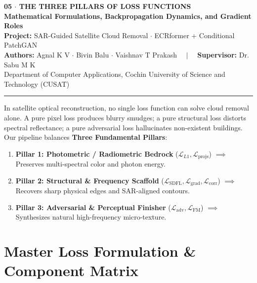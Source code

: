 \documentclass[11pt,a4paper]{article}
\begin{document}
\begin{center}
    {\LARGE \textbf{\textcolor{primary}{05 $\cdot$ THE THREE PILLARS OF LOSS FUNCTIONS}}}\\[0.4em]
    {\large \textbf{Mathematical Formulations, Backpropagation Dynamics, and Gradient Roles}}\\[0.6em]
    {\small \textbf{Project:} SAR-Guided Satellite Cloud Removal $\cdot$ ECRformer + Conditional PatchGAN}\\
    {\small \textbf{Authors:} Agnal K V $\cdot$ Bivin Balu $\cdot$ Vaishnav T Prakash $\quad|\quad$ \textbf{Supervisor:} Dr. Sabu M K}\\
    {\small Department of Computer Applications, Cochin University of Science and Technology (CUSAT)}
\end{center}
\vspace{-0.5em}
\noindent\rule{\linewidth}{1.2pt}

\vspace{0.8em}
\begin{tcolorbox}[colback=primary!5!white,colframe=primary,title=\textbf{Document Purpose \& The Tripartite Loss Architecture},fonttitle=\bfseries]
In satellite optical reconstruction, no single loss function can solve cloud removal alone. A pure pixel loss produces blurry smudges; a pure structural loss distorts spectral reflectance; a pure adversarial loss hallucinates non-existent buildings. Our pipeline balances \textbf{Three Fundamental Pillars}:
\begin{enumerate}[leftmargin=1.5em, itemsep=0.2em]
    \item \textbf{Pillar 1: Photometric / Radiometric Bedrock} ($\mathcal{L}_{L1}, \mathcal{L}_{\text{projs}}$) $\implies$ Preserves multi-spectral color and photon energy.
    \item \textbf{Pillar 2: Structural \& Frequency Scaffold} ($\mathcal{L}_{\text{SDFL}}, \mathcal{L}_{\text{grad}}, \mathcal{L}_{\text{corr}}$) $\implies$ Recovers sharp physical edges and SAR-aligned contours.
    \item \textbf{Pillar 3: Adversarial \& Perceptual Finisher} ($\mathcal{L}_{\text{adv}}, \mathcal{L}_{\text{FM}}$) $\implies$ Synthesizes natural high-frequency micro-texture.
\end{enumerate}
\end{tcolorbox}

\section{Master Loss Formulation \& Component Matrix}
\end{document}
